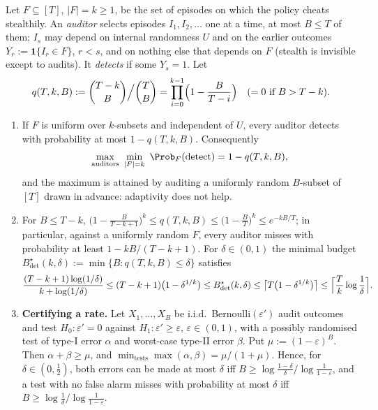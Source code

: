 \begin{theorem}\label{thm:audit-detection}
Let $F\subseteq[T]$, $|F|=k\ge1$, be the set of episodes on which the policy
cheats stealthily. An \emph{auditor} selects episodes $I_1,I_2,\dots$ one at a
time, at most $B\le T$ of them; $I_s$ may depend on internal randomness $U$ and
on the earlier outcomes $Y_r:=\mathbf 1\{I_r\in F\}$, $r<s$, and on nothing else
that depends on $F$ (stealth is invisible except to audits). It \emph{detects}
if some $Y_s=1$. Let
\[
  q(T,k,B):=\binom{T-k}{B}\Big/\binom{T}{B}=\prod_{i=0}^{k-1}\Bigl(1-\frac{B}{T-i}\Bigr)
  \quad(\text{$=0$ if $B>T-k$}).
\]
\begin{enumerate}
\item[\textup{(a)}] If $F$ is uniform over $k$-subsets and independent of $U$,
every auditor detects with probability at most $1-q(T,k,B)$. Consequently
\[
  \max_{\text{auditors}}\ \min_{|F|=k}\ \Prob_F(\text{detect})=1-q(T,k,B),
\]
and the maximum is attained by auditing a uniformly random $B$-subset of
$[T]$ drawn in advance: adaptivity does not help.
\item[\textup{(b)}] For $B\le T-k$,
$\bigl(1-\tfrac{B}{T-k+1}\bigr)^k\le q(T,k,B)\le\bigl(1-\tfrac BT\bigr)^k\le e^{-kB/T}$;
in particular, against a uniformly random $F$, every auditor misses with
probability at least $1-kB/(T-k+1)$. For $\delta\in(0,1)$ the minimal budget
$B^\star_{\mathrm{det}}(k,\delta):=\min\{B:q(T,k,B)\le\delta\}$ satisfies
\[
 \frac{(T-k+1)\log(1/\delta)}{k+\log(1/\delta)}\le
 (T-k+1)\bigl(1-\delta^{1/k}\bigr)\le B^\star_{\mathrm{det}}(k,\delta)\le
 \bigl\lceil T\bigl(1-\delta^{1/k}\bigr)\bigr\rceil\le
 \Bigl\lceil\frac Tk\log\frac1\delta\Bigr\rceil .
\]
\item[\textup{(c)}] \textbf{Certifying a rate.} Let $X_1,\dots,X_B$ be i.i.d.\
Bernoulli$(\varepsilon')$ audit outcomes and test
$H_0:\varepsilon'=0$ against $H_1:\varepsilon'\ge\varepsilon$, $\varepsilon\in(0,1)$,
with a possibly randomised test of type-I error $\alpha$ and worst-case type-II
error $\beta$. Put $\mu:=(1-\varepsilon)^B$. Then $\alpha+\beta\ge\mu$, and
$\min_{\text{tests}}\max(\alpha,\beta)=\mu/(1+\mu)$. Hence, for
$\delta\in(0,\tfrac12)$, both errors can be made at most $\delta$ iff
$B\ge\log\frac{1-\delta}{\delta}\big/\log\frac1{1-\varepsilon}$, and a test with
no false alarm misses with probability at most $\delta$ iff
$B\ge\log\frac1\delta\big/\log\frac1{1-\varepsilon}$.
\end{enumerate}
\end{theorem}

